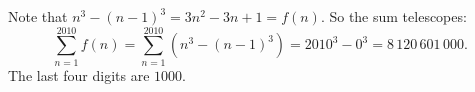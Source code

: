 Note that $n^3-(n-1)^3=3n^2-3n+1=f(n)$. So the sum telescopes:
\[\sum_{n=1}^{2010}f(n)=\sum_{n=1}^{2010}\left(n^3-(n-1)^3\right)=2010^3-0^3=8\,120\,601\,000 .\]
The last four digits are $\boxed{1000}$.

